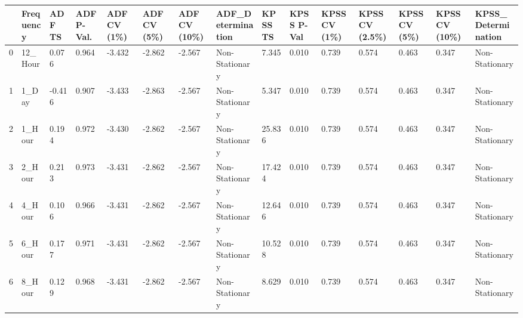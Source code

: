 \begin{tabular}{lllllllllllllll}
\toprule
 & Frequency & ADF TS & ADF P-Val. & ADF CV (1\%) & ADF CV (5\%) & ADF CV (10\%) & ADF_Determination & KPSS TS & KPSS P-Val & KPSS CV (1\%) & KPSS CV (2.5\%) & KPSS CV (5\%) & KPSS CV (10\%) & KPSS_Determination \\
\midrule
0 & 12_Hour & 0.076 & 0.964 & -3.432 & -2.862 & -2.567 & Non-Stationary & 7.345 & 0.010 & 0.739 & 0.574 & 0.463 & 0.347 & Non-Stationary \\
1 & 1_Day & -0.416 & 0.907 & -3.433 & -2.863 & -2.567 & Non-Stationary & 5.347 & 0.010 & 0.739 & 0.574 & 0.463 & 0.347 & Non-Stationary \\
2 & 1_Hour & 0.194 & 0.972 & -3.430 & -2.862 & -2.567 & Non-Stationary & 25.836 & 0.010 & 0.739 & 0.574 & 0.463 & 0.347 & Non-Stationary \\
3 & 2_Hour & 0.213 & 0.973 & -3.431 & -2.862 & -2.567 & Non-Stationary & 17.424 & 0.010 & 0.739 & 0.574 & 0.463 & 0.347 & Non-Stationary \\
4 & 4_Hour & 0.106 & 0.966 & -3.431 & -2.862 & -2.567 & Non-Stationary & 12.646 & 0.010 & 0.739 & 0.574 & 0.463 & 0.347 & Non-Stationary \\
5 & 6_Hour & 0.177 & 0.971 & -3.431 & -2.862 & -2.567 & Non-Stationary & 10.528 & 0.010 & 0.739 & 0.574 & 0.463 & 0.347 & Non-Stationary \\
6 & 8_Hour & 0.129 & 0.968 & -3.431 & -2.862 & -2.567 & Non-Stationary & 8.629 & 0.010 & 0.739 & 0.574 & 0.463 & 0.347 & Non-Stationary \\
\bottomrule
\end{tabular}
